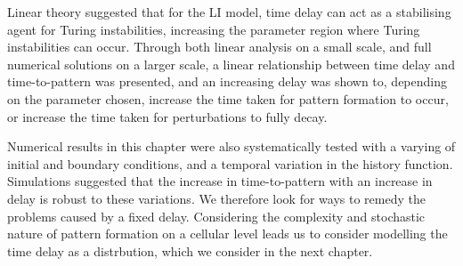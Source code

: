 Linear theory suggested that for the LI model, time delay can act as a stabilising agent for Turing instabilities, increasing the parameter region where Turing instabilities can occur. Through both linear analysis on a small scale, and full numerical solutions on a larger scale, a linear relationship between time delay and time-to-pattern was presented, and an increasing delay was shown to, depending on the parameter chosen, increase the time taken for pattern formation to occur, or increase the time taken for perturbations to fully decay.

Numerical results in this chapter were also systematically tested with a varying of initial and boundary conditions, and a temporal variation in the history function. Simulations suggested that the increase in time-to-pattern with an increase in delay is robust to these variations. We therefore look for ways to remedy the problems caused by a fixed delay. Considering the complexity and stochastic nature of pattern formation on a cellular level leads us to consider modelling the time delay as a distrbution, which we consider in the next chapter.
